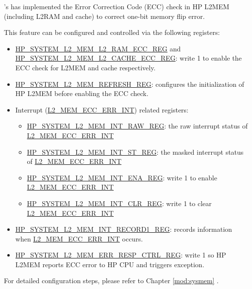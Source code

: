 \documentclass[main\_\_EN.tex]{subfiles}
\begin{document}
\chipname{}'s has implemented the Error Correction Code (ECC) check in HP L2MEM (including L2RAM and cache) to correct one-bit memory flip error.

This feature can be configured and controlled via the following registers:
\begin{itemize}
    \item \hyperref[regdesc:HPSYSTEML2MEML2RAMECCREG]{HP\_SYSTEM\_L2\_MEM\_L2\_RAM\_ECC\_REG} and \hyperref[regdesc:HPSYSTEML2MEML2CACHEECCREG]{HP\_SYSTEM\_L2\_MEM\_L2\_CACHE\_ECC\_REG}: write 1 to enable the ECC check for L2MEM and cache respectively.
    \item \hyperref[regdesc:HPSYSTEML2MEMREFRESHREG]{HP\_SYSTEM\_L2\_MEM\_REFRESH\_REG}: configures the initialization of HP L2MEM before enabling the ECC check.
    \item Interrupt (\hyperref[tab:sysreg-int-sources]{L2\_MEM\_ECC\_ERR\_INT}) related registers:
    \begin{itemize}
        \item \hyperref[regdesc:HPSYSTEML2MEMINTRAWREG]{HP\_SYSTEM\_L2\_MEM\_INT\_RAW\_REG}: the raw interrupt status of \hyperref[tab:sysreg-int-sources]{L2\_MEM\_ECC\_ERR\_INT}
        \item \hyperref[regdesc:HPSYSTEML2MEMINTSTREG]{HP\_SYSTEM\_L2\_MEM\_INT\_ST\_REG}: the masked interrupt status of \hyperref[tab:sysreg-int-sources]{L2\_MEM\_ECC\_ERR\_INT}
        \item \hyperref[regdesc:HPSYSTEML2MEMINTENAREG]{HP\_SYSTEM\_L2\_MEM\_INT\_ENA\_REG}: write 1 to enable \hyperref[tab:sysreg-int-sources]{L2\_MEM\_ECC\_ERR\_INT}
        \item \hyperref[regdesc:HPSYSTEML2MEMINTCLRREG]{HP\_SYSTEM\_L2\_MEM\_INT\_CLR\_REG}: write 1 to clear \hyperref[tab:sysreg-int-sources]{L2\_MEM\_ECC\_ERR\_INT}
    \end{itemize}
    \item \hyperref[regdesc:HPSYSTEML2MEMINTRECORD1REG]{HP\_SYSTEM\_L2\_MEM\_INT\_RECORD1\_REG}: records information when \hyperref[tab:sysreg-int-sources]{L2\_MEM\_ECC\_ERR\_INT} occurs.
    \item \hyperref[regdesc:HPSYSTEML2MEMERRRESPCTRLREG]{HP\_SYSTEM\_L2\_MEM\_ERR\_RESP\_CTRL\_REG}: write 1 so HP L2MEM reports ECC error to HP CPU and triggers exception.
\end{itemize}

For detailed configuration steps, please refer to Chapter \ref{mod:sysmem} \textit{}.
\end{document}
